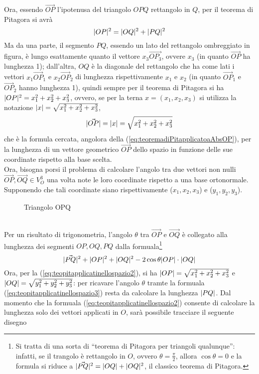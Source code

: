 Ora, essendo $\vec{OP}$ l'ipotenusa del triangolo $OPQ$ rettangolo in $Q$, per il teorema di Pitagora si avrà
\begin{equation}
  \label{eq:teopitapplicatinellospazio}
  \lvert OP\rvert^2=\lvert OQ\rvert^2+\lvert PQ\rvert^2
\end{equation}
Ma da una parte, il segmento $PQ$, essendo un lato del rettangolo ombreggiato in figura, è lungo esattamente quanto il vettore $x_3\vec{OP_3}$, ovvere $x_3$ (in quanto $\vec{OP}$ ha lunghezza 1); dall'altra, $OQ$ è la diagonale del rettangolo che ha come lati i vettori $x_1\vec{OP}_1$ e $x_2\vec{OP}_2$ di lunghezza rispettivamente $x_1$ e $x_2$ (in quanto $\vec{OP}_1$ e $\vec{OP}_2$ hanno lunghezza 1), quindi sempre per il teorema di Pitagora si ha $\lvert OP\rvert^2=x_1^2+x_2^2+x_3^2$, ovvero, se per la terna $x=(x_1,x_2,x_3)$ si utilizza la notazione $\lvert x\rvert=\sqrt{x_1^2+x_2^2+x_3^2}$,
\begin{equation}
  \label{eq:teopitapplicatinellospazio2}
  \lvert\vec{OP}\rvert=\lvert x\rvert=\sqrt{x_1^2+x_2^2+x_3^2}
\end{equation}
che è la formula cercata, angolora della (\ref{eq:teoremadiPitapplicatoaAbsOP}), per la lunghezza di un vettore geometrico $\vec{OP}$ dello spazio in funzione delle sue coordinate rispetto alla base scelta.\\
Ora, bisogna porsi il problema di calcolare l'angolo tra due vettori non nulli $\vec{OP}, \vec{OQ}\in V_O^3$ una volta note le loro coordinate rispetto a una base ortonormale. Supponendo che tali coordinate siano rispettivamente ($x_1,x_2,x_3$) e ($y_1,y_2,y_3$).
\begin{figure}[ht!]
  \centering
  \resizebox{4cm}{!}{
      
    }
  \caption{Triangolo OPQ}
  \label{fig:triangoloOPQ1}
\end{figure}\\
Per un risultato di trigonometria, l'angolo $\theta$ tra $\vec{OP}$ e $\vec{OQ}$ è collegato alla lunghezza dei segmenti $OP,OQ,PQ$ dalla formuala\footnote{Si tratta di una sorta di ``teorema di Pitagora per triangoli qualunque'': infatti, se il trangolo è rettangolo in $O$, ovvero $\theta=\frac{\pi}{2}$, allora $\cos\theta=0$ e la formula si riduce a $\lvert\vec{PQ}\rvert^2=\lvert OQ\rvert+\lvert OQ\rvert^2$, il classico teorema di Pitagora.}
\begin{equation}
  \label{eq:teopitapplicatinellospazio3}
  \lvert\vec{PQ}\rvert^2+\lvert OP\rvert^2+\lvert OQ\rvert^2-2\cos\theta\lvert OP\rvert\cdot\lvert OQ\rvert
\end{equation}
Ora, per la (\ref{eq:teopitapplicatinellospazio2}), si ha $\lvert OP\rvert=\sqrt{x_1^2+x_2^2+x_3^2}$ e $\lvert OQ\rvert=\sqrt{y_1^2+y_2^2+y_3^2}$: per ricavare l'angolo $\theta$ tramte la formuala (\ref{eq:teopitapplicatinellospazio3}) resta da calcolare la lunghezza $\lvert PQ\rvert$. Dal momento che la formuala (\ref{eq:teopitapplicatinellospazio2}) consente di calcolare la lunghezza solo dei vettori applicati in $O$, sarà possibile tracciare il seguente disegno
